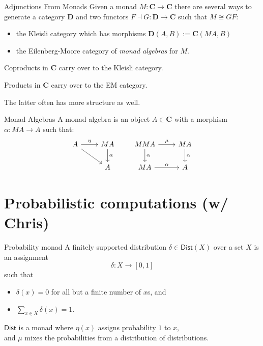 \documentclass[aspectratio=1610,mathserif]{beamer}
\begin{document}
\begin{frame}{Adjunctions From Monads}
  Given a monad $M : \mathbf{C} \rightarrow \mathbf{C}$
  there are several ways to generate a category $\mathbf{D}$
  and two functors $F \dashv G : \mathbf{D} \rightarrow \mathbf{C}$
  such that $M \cong GF$:
  \begin{itemize}
    \item the Kleisli category which has morphisms
      $\mathbf{D}(A, B) := \mathbf{C}(M A, B)$ 
    \item the Eilenberg-Moore category of \emph{monad algebras} for $M$.
  \end{itemize}

  Coproducts in $\mathbf{C}$ carry over to the Kleisli category.

  Products in $\mathbf{C}$ carry over to the EM category.

  The latter often has more structure as well.
\end{frame}

\begin{frame}[fragile]{Monad Algebras}
  A monad algebra is an object $A \in \mathbf{C}$ with a morphism
  $\alpha : MA \rightarrow A$ such that:
  \[
    \begin{tikzcd}
      A \ar[r, "\eta"] \ar[rd, =] &
      MA \ar[d, "\alpha"] \\
      & A
    \end{tikzcd}
    \qquad
    \begin{tikzcd}
      MMA \ar[r, "\mu"] \ar[d, "\alpha"] &
      MA \ar[d, "\alpha"] \\
      MA \ar[r, "\alpha"] &
      A
    \end{tikzcd}
  \]
\end{frame}


\section{Probabilistic computations (w/ Chris)} %
\frame\sectionpage

\begin{frame}{Probability monad}
  A finitely supported distribution $\delta \in \mathsf{Dist}(X)$
  over a set $X$ is an assignment
  \[ \delta : X \rightarrow [0,1] \]
  such that
  \begin{itemize}
    \item $\delta(x) = 0$ for all but a finite number of $x$s, and
    \item $\sum_{x\in X} \delta(x) = 1$.
  \end{itemize}

  \vspace{1em}
  $\mathsf{Dist}$ is a monad where $\eta(x)$
  assigns probability $1$ to $x$, \\ and $\mu$
  mixes the probabilities from a distribution of distributions.
\end{frame}
\end{document}
